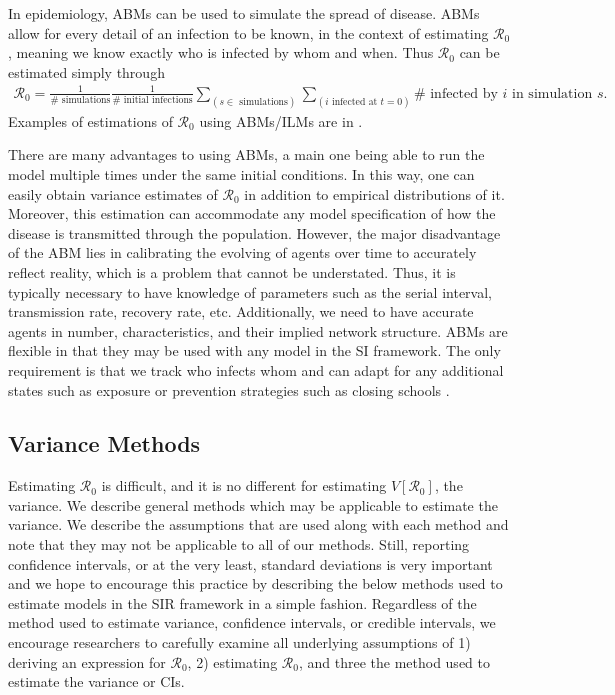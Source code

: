 \documentclass[12pt]{article}
\newcommand{\rr}{\ensuremath{\mathcal{R}_0}}
\begin{document}
In epidemiology, ABMs can be used to simulate the spread of disease.  ABMs allow for every detail of an infection to be known, in the context of estimating $\rr$, meaning we know exactly who is infected by whom and when.  Thus $\rr$ can be estimated simply through
\begin{align*}
  \rr = \frac{1}{\# \text{ simulations}}\frac{1}{\#\text{ initial infections}} \sum_{(s \in \text{ simulations})}\sum_{(i \text{ infected at } t=0)} \# \text{ infected by $i$ in simulation }s.
\end{align*}
Examples of estimations of $\rr$ using ABMs/ILMs are in \cite{breban2007,ahmed2013variance}.

There are many advantages to using ABMs, a main one being able to run the model multiple times under the same initial conditions.  In this way, one can easily obtain variance estimates of $\rr$ in addition to empirical distributions of it.  Moreover, this estimation can accommodate any model specification of how the disease is transmitted through the population.  However, the major disadvantage of the ABM lies in calibrating the evolving of agents over time to accurately reflect reality, which is a problem that cannot be understated.  Thus, it is typically necessary to have knowledge of parameters such as the serial interval, transmission rate, recovery rate, etc.  Additionally, we need to have accurate agents in number, characteristics, and their implied network structure.  ABMs are flexible in that they may be used with any model in the SI framework.  The only requirement is that we track who infects whom and can adapt for any additional states such as exposure or prevention strategies such as closing schools \citep{fred}.







\subsection{Variance Methods}
\label{sec:methods}

Estimating $\rr$ is difficult, and it is no different for estimating $V[\rr]$, the variance.  We describe general methods which may be applicable to estimate the variance.  We describe the assumptions that are used along with each method and note that they may not be applicable to all of our methods.  Still, reporting confidence intervals, or at the very least, standard deviations is very important and we hope to encourage this practice by describing the below methods used to estimate models in the SIR framework in a simple fashion.  Regardless of the method used to estimate variance, confidence intervals, or credible intervals, we encourage researchers to carefully examine all underlying assumptions of 1) deriving an expression for $\rr$, 2) estimating $\rr$, and three the method used to estimate the variance or CIs.
\end{document}

